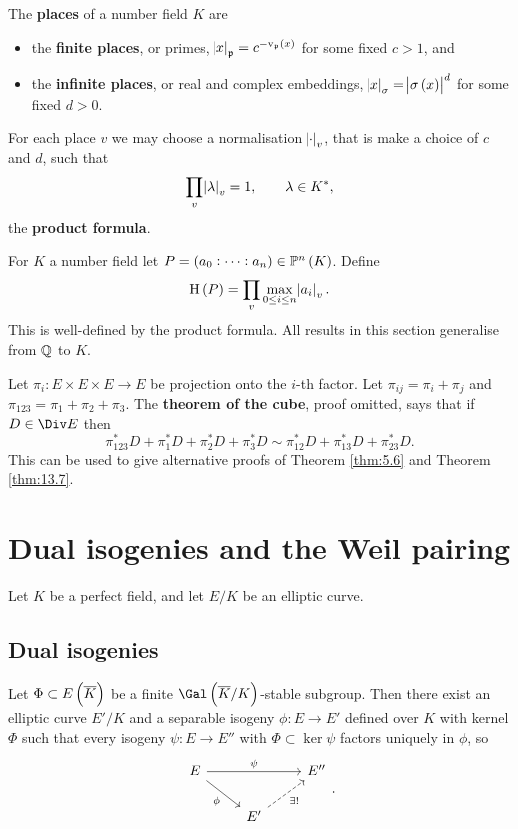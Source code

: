 \pagebreak

The \textbf{places} of a number field $ K $ are
\begin{itemize}
\item the \textbf{finite places}, or primes, $ \abs{x}_\ppp = c^{-\v_\ppp\br{x}} $ for some fixed $ c > 1 $, and
\item the \textbf{infinite places}, or real and complex embeddings, $ \abs{x}_\sigma = \abs{\sigma\br{x}}^d $ for some fixed $ d > 0 $.
\end{itemize}
For each place $ v $ we may choose a normalisation $ \abs{\cdot}_v $, that is make a choice of $ c $ and $ d $, such that
$$ \prod_v \abs{\lambda}_v = 1, \qquad \lambda \in K^*, $$
the \textbf{product formula}.

\begin{remark*}
For $ K $ a number field let $ P = \br{a_0 : \dots : a_n} \in \PP^n\br{K} $. Define
$$ \H\br{P} = \prod_v \max_{0 \le i \le n} \abs{a_i}_v. $$
This is well-defined by the product formula. All results in this section generalise from $ \mathbb{Q} $ to $ K $.
\end{remark*}

\begin{remark*}
Let $ \pi_i : E \times E \times E \to E $ be projection onto the $ i $-th factor. Let $ \pi_{ij} = \pi_i + \pi_j $ and $ \pi_{123} = \pi_1 + \pi_2 + \pi_3 $. The \textbf{theorem of the cube}, proof omitted, says that if $ D \in \Div E $ then
$$ \pi_{123}^*D + \pi_1^*D + \pi_2^*D + \pi_3^*D \sim \pi_{12}^*D + \pi_{13}^*D + \pi_{23}^*D. $$
This can be used to give alternative proofs of Theorem \ref{thm:5.6} and Theorem \ref{thm:13.7}.
\end{remark*}

\pagebreak

\section{Dual isogenies and the Weil pairing}

Let $ K $ be a perfect field, and let $ E / K $ be an elliptic curve.

\subsection{Dual isogenies}

\begin{proposition}
\label{prop:14.1}
Let $ \Phi \subset E\br{\overline{K}} $ be a finite $ \Gal\br{\overline{K} / K} $-stable subgroup. Then there exist an elliptic curve $ E' / K $ and a separable isogeny $ \phi : E \to E' $ defined over $ K $ with kernel $ \Phi $ such that every isogeny $ \psi : E \to E'' $ with $ \Phi \subset \ker \psi $ factors uniquely in $ \phi $, so
$$
\begin{tikzcd}
E \arrow{rr}{\psi} \arrow{dr}[swap]{\phi} & & E'' \\
& E' \arrow[dashed]{ur}[swap]{\exists !} &
\end{tikzcd}.
$$
\end{proposition}

